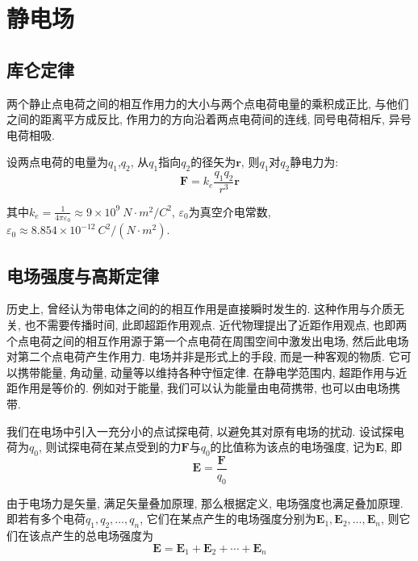 \chapter{静电场}
\section{库仑定律}

\begin{theorem}[库仑定律]
两个静止点电荷之间的相互作用力的大小与两个点电荷电量的乘积成正比, 与他们之间的距离平方成反比, 作用力的方向沿着两点电荷间的连线, 同号电荷相斥, 异号电荷相吸.

设两点电荷的电量为$q_1$,$q_2$, 从$q_1$指向$q_2$的径矢为$\mathbf{r}$, 则$q_1$对$q_2$静电力为:
\[
\mathbf{F} = k_e \frac{q_1 q_2}{r^3}\mathbf{r}
\]

其中$k_e = \frac{1}{4\pi \varepsilon_0} \approx 9\times 10^9\ N\cdot m^2/C^2$, $\varepsilon_0$为真空介电常数, $\varepsilon_0 \approx 8.854\times 10^{-12}\ C^2/(N\cdot m^2)$.
\end{theorem}

\section{电场强度与高斯定律}

历史上, 曾经认为带电体之间的的相互作用是直接瞬时发生的. 这种作用与介质无关, 也不需要传播时间, 此即超距作用观点. 近代物理提出了近距作用观点, 也即两个点电荷之间的相互作用源于第一个点电荷在周围空间中激发出电场, 然后此电场对第二个点电荷产生作用力. 电场并非是形式上的手段, 而是一种客观的物质. 它可以携带能量, 角动量, 动量等以维持各种守恒定律. 在静电学范围内, 超距作用与近距作用是等价的. 例如对于能量, 我们可以认为能量由电荷携带, 也可以由电场携带.

\begin{definition}[电场强度]
  我们在电场中引入一充分小的点试探电荷, 以避免其对原有电场的扰动. 设试探电荷为$q_0$, 则试探电荷在某点受到的力$\mathbf{F}$与$q_0$的比值称为该点的电场强度, 记为$\mathbf{E}$, 即
  \[
  \mathbf{E} = \frac{\mathbf{F}}{q_0}
  \]
\end{definition}
\begin{theorem}[场强叠加原理]
  由于电场力是矢量, 满足矢量叠加原理, 那么根据定义, 电场强度也满足叠加原理. 即若有多个电荷$q_1,q_2,\ldots,q_n$, 它们在某点产生的电场强度分别为$\mathbf{E}_1,\mathbf{E}_2,\ldots,\mathbf{E}_n$, 则它们在该点产生的总电场强度为
  \[
  \mathbf{E} = \mathbf{E}_1 + \mathbf{E}_2 + \cdots + \mathbf{E}_n
  \]
\end{theorem}

